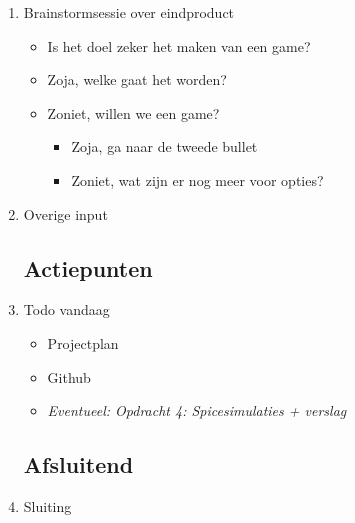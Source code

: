 \documentclass{article}
\begin{document}
\begin{enumerate}
	\item Brainstormsessie over eindproduct
	\begin{itemize}
		\item Is het doel zeker het maken van een game?
		\item Zoja, welke gaat het worden?
		\item Zoniet, willen we een game?
		\begin{itemize}
			\item Zoja, ga naar de tweede bullet
			\item Zoniet, wat zijn er nog meer voor opties?
		\end{itemize}
	\end{itemize}	

	\item Overige input
	\subsection*{Actiepunten}
	\item Todo vandaag
	\begin{itemize}
		\item Projectplan
		\item Github
		\item \textit{Eventueel: Opdracht 4: Spicesimulaties + verslag}
	\end{itemize}

	\noindent 
	\subsection*{Afsluitend}
	\item Sluiting

\end{enumerate}
\end{document}
